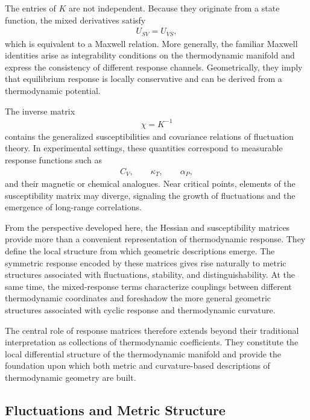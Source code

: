 The entries of \(K\) are not independent. Because they originate from a state function, the mixed derivatives satisfy
\begin{align}
U_{SV}=U_{VS},
\end{align}
which is equivalent to a Maxwell relation. More generally, the familiar Maxwell identities arise as integrability conditions on the thermodynamic manifold and express the consistency of different response channels. Geometrically, they imply that equilibrium response is locally conservative and can be derived from a thermodynamic potential.

The inverse matrix
\begin{align}
\chi = K^{-1}
\end{align}
contains the generalized susceptibilities and covariance relations of fluctuation theory. In experimental settings, these quantities correspond to measurable response functions such as
\begin{align}
C_V,
\qquad
\kappa_T,
\qquad
\alpha_P,
\end{align}
and their magnetic or chemical analogues. Near critical points, elements of the susceptibility matrix may diverge, signaling the growth of fluctuations and the emergence of long-range correlations.

From the perspective developed here, the Hessian and susceptibility matrices provide more than a convenient representation of thermodynamic response. They define the local structure from which geometric descriptions emerge. The symmetric response encoded by these matrices gives rise naturally to metric structures associated with fluctuations, stability, and distinguishability. At the same time, the mixed-response terms characterize couplings between different thermodynamic coordinates and foreshadow the more general geometric structures associated with cyclic response and thermodynamic curvature.

The central role of response matrices therefore extends beyond their traditional interpretation as collections of thermodynamic coefficients. They constitute the local differential structure of the thermodynamic manifold and provide the foundation upon which both metric and curvature-based descriptions of thermodynamic geometry are built.


\subsection{Fluctuations and Metric Structure}

